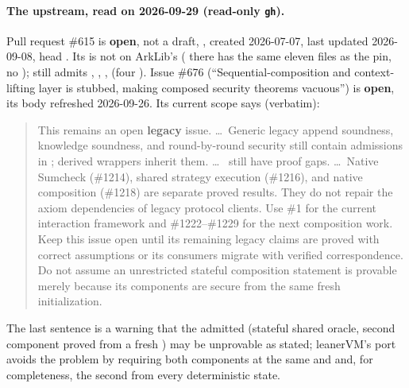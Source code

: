 \paragraph{The upstream, read on 2026-09-29 (read-only \texttt{gh}).} Pull request \#615 is
\textbf{open}, not a draft, , created 2026-07-07, last updated
2026-09-08, head . Its  is not on ArkLib's 
(\allowbreak{}\allowbreak{} there has the same eleven files as the pin, no
); \allowbreak{} still admits ,
, , \allowbreak{}
(four ). Issue \#676 (\enquote{Sequential-composition and context-lifting layer is
stubbed, making composed security theorems vacuous}) is \textbf{open}, its body refreshed
2026-09-26. Its current scope says (verbatim):
\begin{quote}\small
This remains an open \textbf{legacy } issue. \dots\ Generic legacy append
soundness, knowledge soundness, and round-by-round security still contain admissions in
\allowbreak{}\allowbreak{}\allowbreak{}; derived wrappers inherit them. \dots\
\allowbreak{} still have proof gaps. \dots\ Native Sumcheck (\#1214), shared
strategy execution (\#1216), and native composition (\#1218) are separate proved results. They do
not repair the axiom dependencies of legacy protocol clients. Use \#1 for the current interaction
framework and \#1222--\#1229 for the next composition work. Keep this issue open until its
remaining legacy claims are proved with correct assumptions or its consumers migrate with verified
correspondence. Do not assume an unrestricted stateful composition statement is provable merely
because its components are secure from the same fresh initialization.
\end{quote}
The last sentence is a warning that the admitted \allowbreak{} (stateful
shared oracle, second component proved from a fresh ) may be unprovable as stated;
leanerVM's port avoids the problem by requiring both components at the same \lean{init} and
\lean{impl} and, for completeness, the second from every deterministic state.

